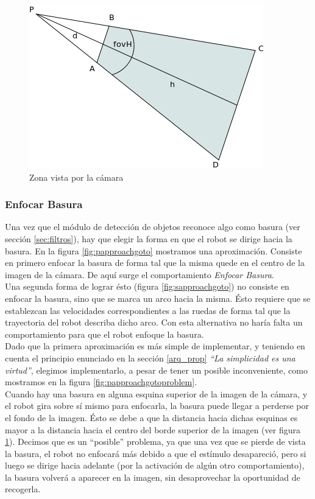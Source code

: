 \begin{figure}[htp]
\begin{center}
\includegraphics[scale=0.5]{comportamientos/figures/rectangleWander.png}
\caption{Zona vista por la c\'amara}
\label{fig:zoneCamera}
\end{center}
\end{figure}

\subsubsection{Enfocar Basura}
\label{focus_garbage}
Una vez que el m\'odulo de detecci\'on de objetos reconoce algo como basura
(ver secci\'on \ref{sec:filtros}), hay que elegir
la forma en que el robot se dirige hacia la basura. En la figura
\ref{fig:papproachgoto} mostramos una aproximaci\'on. Consiste en primero
enfocar la basura de forma tal que la misma quede en el centro de la imagen de
la c\'amara. De aqu\'i surge el comportamiento \emph{Enfocar Basura}.
\\\indent
Una segunda forma de lograr \'esto (figura \ref{fig:sapproachgoto}) no consiste
en enfocar la basura, sino que se marca un arco hacia la misma. \'Esto requiere
que se establezcan las velocidades correspondientes a las ruedas de forma tal
que la trayectoria del robot describa dicho arco. Con esta alternativa no
har\'ia falta un comportamiento para que el robot enfoque la basura.
\\\indent
Dado que la primera aproximaci\'on es m\'as simple de implementar, y
teniendo en cuenta el principio enunciado en la secci\'on \ref{arq_prop}
\emph{``La simplicidad es una virtud''}, elegimos implementarlo, a
pesar de tener un posible inconveniente, como mostramos en la figura
\ref{fig:papproachgotoproblem}.
\\\indent
Cuando hay una basura en alguna esquina superior de la imagen de la c\'amara,
y el robot gira sobre s\'i mismo para enfocarla, la basura puede llegar a
perderse por el fondo de la imagen. \'Esto se debe a que la distancia hacia
dichas esquinas es mayor a la distancia hacia el centro del borde superior de
la imagen (ver figura \ref{fig:zoneCamera}). Decimos que es un ``posible''
problema, ya que una vez que se pierde de vista la basura, el robot no
enfocar\'a m\'as debido a que el est\'imulo desapareci\'o, pero si luego se
dirige hacia adelante (por la activaci\'on de alg\'un otro comportamiento), la
basura volver\'a a aparecer en la imagen, sin desaprovechar la oportunidad de
recogerla.

